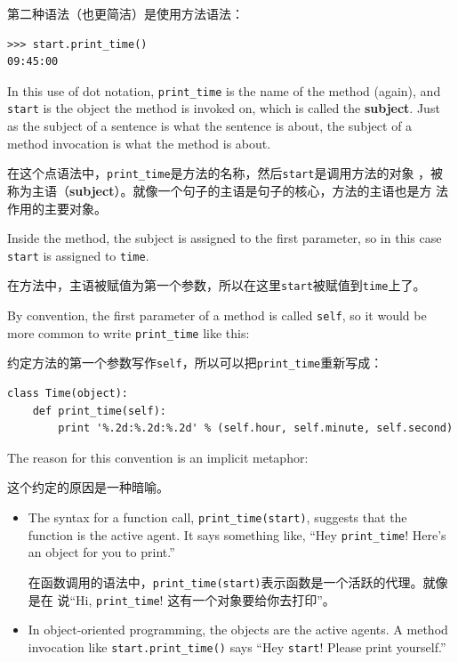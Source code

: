 \documentclass[10pt]{book}
\begin{document}
\begin{CJK}{UTF8}{gbsn}
第二种语法（也更简洁）是使用方法语法：

\begin{verbatim}
>>> start.print_time()
09:45:00
\end{verbatim}
%
In this use of dot notation, \verb"print_time" is the name of the
method (again), and {\tt start} is the object the method is
invoked on, which is called the {\bf subject}.  Just as the
subject of a sentence is what the sentence is about, the subject
of a method invocation is what the method is about.

在这个点语法中，\verb"print_time"是方法的名称，然后{\tt start}是调用方法的对象
，被称为主语（{\bf subject}）。就像一个句子的主语是句子的核心，方法的主语也是方
法作用的主要对象。

Inside the method, the subject is assigned to the first
parameter, so in this case {\tt start} is assigned
to {\tt time}.

在方法中，主语被赋值为第一个参数，所以在这里{\tt start}被赋值到{\tt time}上了。

By convention, the first parameter of a method is
called {\tt self}, so it would be more common to write
\verb"print_time" like this:

约定方法的第一个参数写作{\tt self}，所以可以把\verb"print_time"重新写成：

\begin{verbatim}
class Time(object):
    def print_time(self):
        print '%.2d:%.2d:%.2d' % (self.hour, self.minute, self.second)
\end{verbatim}
%
The reason for this convention is an implicit metaphor:

这个约定的原因是一种暗喻。

\begin{itemize}

\item The syntax for a function call, \verb"print_time(start)",
  suggests that the function is the active agent.  It says something
  like, ``Hey \verb"print_time"!  Here's an object for you to print.''

在函数调用的语法中，\verb"print_time(start)"表示函数是一个活跃的代理。就像是在
说``Hi, \verb"print_time"! 这有一个对象要给你去打印''。

\item In object-oriented programming, the objects are the active
  agents.  A method invocation like \verb"start.print_time()" says
  ``Hey {\tt start}!  Please print yourself.''


\end{itemize}
\end{CJK}
\end{document}
